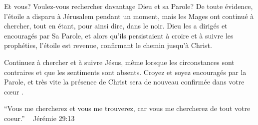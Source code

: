 Et vous? Voulez-vous rechercher davantage Dieu et sa Parole? De toute évidence, l'étoile a disparu à Jérusalem pendant un moment, mais les Mages ont continué à chercher, tout en étant, pour ainsi dire, dans le noir. Dieu les a dirigés et encouragés par Sa Parole, et alors qu'ils persistaient à croire et à suivre les prophéties, l'étoile est revenue, confirmant le chemin jusqu'à Christ.

Continuez à chercher et à suivre Jésus, même lorsque les circonstances sont contraires et que les sentiments sont absents. Croyez et soyez encouragés par la Parole, et très vite la présence de Christ sera de nouveau confirmée dans votre cœur .

“Vous me chercherez et vous me trouverez, car vous me chercherez de tout votre coeur.”  ~ Jérémie 29:13
